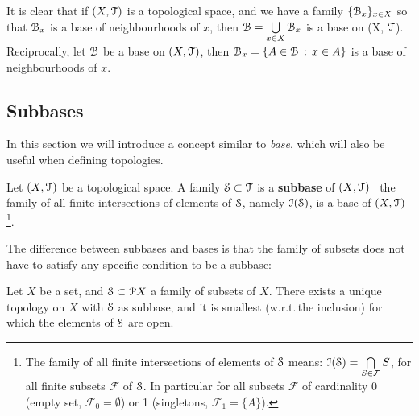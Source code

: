 It is clear that if $(X,\T)$ is a topological space, and we have a family
$\{\B_x\}_{x\in X}$ so that $\B_x$ is a base of neighbourhoods of $x$, then
$\B=\bigcup\limits_{x\in X}\B_x$ is a base on (X, $\T$).
Reciprocally, let $\B$ be a base on $(X, \T)$, then $\B_x = \setdef{A\in\B}{x\in A}$ is
a base of neighbourhoods of $x$.

\subsection{Subbases}\label{subsec:subbases}

In this section we will introduce a concept similar to \emph{base}, which will also be
useful when defining topologies.

\begin{definition}
\label{def:subbase}
	Let $(X, \T)$ be a topological space. A family $\S\subset \T$ is a \textbf{subbase}
	of $(X, \T)$ \iff\ the family of all finite intersections of elements of $\S$, namely
	$\I(\S)$, is a base of $(X, \T)$\footnote{The family of all finite intersections of
	elements of $\S$ means: $\I(\S) = \bigcap\limits_{S\in\mathcal{F}} S$, for all finite subsets
	$\mathcal{F}$ of $\S$. In particular for all subsets $\mathcal{F}$ of cardinality
	0 (empty set, $\mathcal{F}_0=\emptyset$) or 1 (singletons, $\mathcal{F}_1=\{A\}$).}.
\end{definition}

The difference between subbases and bases is that the family of subsets does not have
to satisfy any specific condition to be a subbase:

\begin{theorem}
	Let $X$ be a set, and $\S\subset \P X$ a family of subsets of $X$.
	There exists a unique topology on $X$ with $\S$ as subbase, and it is smallest
	(w.r.t.\,the inclusion) for which the elements of $\S$ are open.
	\label{th:1-4}
\end{theorem}

